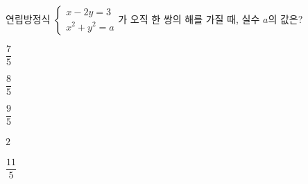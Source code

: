 연립방정식 $\begin{cases} x-2y=3 \\ x^2+y^2=a \end{cases}$가 오직 한 쌍의 해를 가질 때, 실수 $a$의 값은?
\begin{choicesii}{\rule[-3ex]{0pt}{8ex}$\dfrac{7}{5}$}{\rule[-3ex]{0pt}{8ex}$\dfrac{8}{5}$}{\rule[-3ex]{0pt}{8ex}$\dfrac{9}{5}$}{\rule[-3ex]{0pt}{8ex}$2$}{\rule[-3ex]{0pt}{8ex}$\dfrac{11}{5}$}\end{choicesii}
